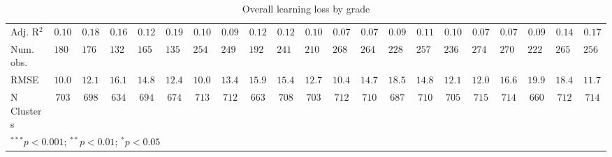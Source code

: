 \begin{table}
\begin{center}
\begin{tabular}{l c c c c c c c c c c c c c c c c c c c c}
Adj. R$^2$                & $0.10$      & $0.18$      & $0.16$   & $0.12$   & $0.19$   & $0.10$        & $0.09$       & $0.12$   & $0.12$   & $0.10$   & $0.07$       & $0.07$      & $0.09$   & $0.11$      & $0.10$   & $0.07$        & $0.07$      & $0.09$   & $0.14$       & $0.17$       \\
Num. obs.                 & $18073$     & $17692$     & $13228$  & $16554$  & $13511$  & $25403$       & $24922$      & $19249$  & $24111$  & $21008$  & $26817$      & $26439$     & $22871$  & $25785$     & $23611$  & $27471$       & $27012$     & $22244$  & $26512$      & $25697$      \\
RMSE                      & $10.03$     & $12.16$     & $16.13$  & $14.85$  & $12.45$  & $10.03$       & $13.41$      & $15.93$  & $15.47$  & $12.75$  & $10.47$      & $14.77$     & $18.52$  & $14.89$     & $12.17$  & $12.02$       & $16.68$     & $19.94$  & $18.46$      & $11.78$      \\
N Clusters                & $703$       & $698$       & $634$    & $694$    & $674$    & $713$         & $712$        & $663$    & $708$    & $703$    & $712$        & $710$       & $687$    & $710$       & $705$    & $715$         & $714$       & $660$    & $712$        & $714$        \\
\hline
\multicolumn{21}{l}{\scriptsize{$^{***}p<0.001$; $^{**}p<0.01$; $^{*}p<0.05$}}
\end{tabular}
\caption{Overall learning loss by grade}
\label{table:grade}
\end{center}
\end{table}
